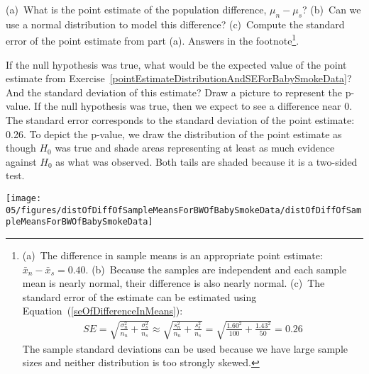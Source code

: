 \begin{exercise} \label{pointEstimateDistributionAndSEForBabySmokeData}
(a)~What is the point estimate of the population difference, $\mu_{n} - \mu_{s}$? (b)~Can we use a normal distribution to model this difference? (c)~Compute the standard error of the point estimate from part (a). Answers in the footnote\footnote{(a)~The difference in sample means is an appropriate point estimate: $\bar{x}_{n} - \bar{x}_{s} = 0.40$. (b)~Because the samples are independent and each sample mean is nearly normal, their difference is also nearly normal. (c)~The standard error of the estimate can be estimated using Equation~(\ref{seOfDifferenceInMeans}):
\begin{eqnarray*}
SE = \sqrt{\frac{\sigma_n^2}{n_n} + \frac{\sigma_s^2}{n_s}}
	\approx \sqrt{\frac{s_n^2}{n_n} + \frac{s_s^2}{n_s}}
	= \sqrt{\frac{1.60^2}{100} + \frac{1.43^2}{50}}
	= 0.26
\end{eqnarray*}
The sample standard deviations can be used because we have large sample sizes and neither distribution is too strongly skewed.}.
\end{exercise}

\begin{example}{If the null hypothesis was true, what would be the expected value of the point estimate from Exercise~\ref{pointEstimateDistributionAndSEForBabySmokeData}? And the standard deviation of this estimate? Draw a picture to represent the p-value.} \label{pictureOfPValueForEstimateOfDiffOfMeansOfBirthWeights}
If the null hypothesis was true, then we expect to see a difference near 0. The standard error corresponds to the standard deviation of the point estimate: 0.26. To depict the p-value, we draw the distribution of the point estimate as though $H_0$ was true and shade areas representing at least as much evidence against $H_0$ as what was observed. Both tails are shaded because it is a two-sided test.
\begin{center}
\texttt{[image: 05/figures/distOfDiffOfSampleMeansForBWOfBabySmokeData/distOfDiffOfSampleMeansForBWOfBabySmokeData]}
\end{center}
\end{example}

